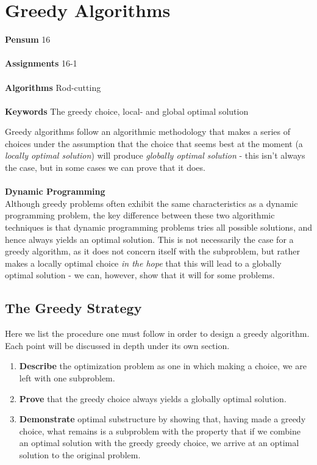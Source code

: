 
\chapter{Greedy Algorithms}
\label{ch:greedyalgorithms}

\textbf{Pensum} 16 \cite{clrs} \\\\
\textbf{Assignments} 16-1 \\\\
\textbf{Algorithms} Rod-cutting \\\\
\textbf{Keywords} The greedy choice, local- and global optimal solution
\vspace{1in}

\noindent Greedy algorithms follow an algorithmic methodology that makes a
series of choices under the assumption that the choice that seems best at the
moment (a \textit{locally optimal solution}) will produce \textit{globally
optimal solution} - this isn't always the case, but in some cases we can prove
that it does.
\\\\
\noindent \textbf{Dynamic Programming} \\
Although greedy problems often exhibit the same characteristics as a dynamic
programming problem, the key difference between these two algorithmic
techniques is that dynamic programming problems tries all possible solutions,
and hence always yields an optimal solution. This is not necessarily the case
for a greedy algorithm, as it does not concern itself with the subproblem, but
rather makes a locally optimal choice \textit{in the hope} that this will lead
to a globally optimal solution - we can, however, show that it will for some
problems.

\newpage
\section{The Greedy Strategy}
Here we list the procedure one must follow in order to design a greedy
algorithm. Each point will be discussed in depth under its own section.
\begin{enumerate}
	\item \textbf{Describe} the optimization problem as one in which making a
choice, we are left with one subproblem.
	\item \textbf{Prove} that the greedy choice always yields a globally
optimal solution.
	\item \textbf{Demonstrate} optimal substructure by showing that, having
made a greedy choice, what remains is a subproblem with the property that if
we combine an optimal solution with the greedy greedy choice, we arrive at an
optimal solution to the original problem.
\end{enumerate}

